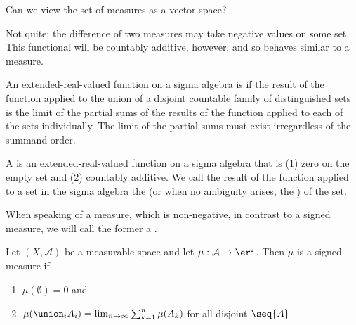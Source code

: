 
\sbasic



























\sstart
{}


Can we view the set of
measures as a vector space?

Not quite:
the difference of two measures
may take negative values
on some set.
This functional
will be countably
additive, however, and
so behaves similar to a measure.


An extended-real-valued
function on a
sigma algebra is
if the result of the function applied to
the union of a disjoint countable family of
distinguished sets is the limit of the partial
sums of the results of the function applied
to each of the sets individually.
The limit of the partial sums must
exist irregardless of the summand order.

A
is an extended-real-valued
function on a
sigma algebra that is
(1) zero on the empty set and
(2) countably additive.
We call the result of the function
applied to a set in the sigma
algebra the
(or when no ambiguity arises, the
)
of the set.

When speaking of a measure,
which is non-negative,
in contrast to a signed measure,
we will call the former a
.


Let
$(X, \mathcal{A})$
be a measurable space
and let
$\mu: \mathcal{A} \to \eri$.
Then $\mu$ is a signed measure if
\begin{enumerate}
  \item $\mu(\emptyset) = 0$ and
  \item
  $\mu(\union_{i} A_i) =
    \lim_{n \to \infty}
      \sum_{k = 1}^{n} \mu(A_k)$
  for all disjoint $\seq{A}$.
\end{enumerate}

